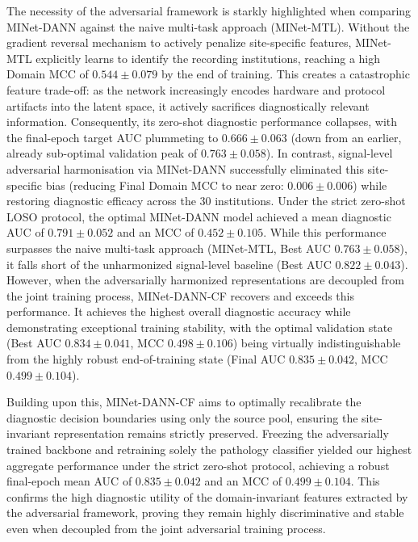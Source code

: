 \documentclass[preprint,12pt]{elsarticle}
\begin{document}
The necessity of the adversarial framework is starkly highlighted when comparing MINet-DANN against the naive multi-task approach (MINet-MTL). Without the gradient reversal mechanism to actively penalize site-specific features, MINet-MTL explicitly learns to identify the recording institutions, reaching a high Domain MCC of $0.544 \pm 0.079$ by the end of training. This creates a catastrophic feature trade-off: as the network increasingly encodes hardware and protocol artifacts into the latent space, it actively sacrifices diagnostically relevant information. Consequently, its zero-shot diagnostic performance collapses, with the final-epoch target AUC plummeting to $0.666 \pm 0.063$ (down from an earlier, already sub-optimal validation peak of $0.763 \pm 0.058$).
In contrast, signal-level adversarial harmonisation via MINet-DANN successfully eliminated this site-specific bias (reducing Final Domain MCC to near zero: $0.006 \pm 0.006$) while restoring diagnostic efficacy across the 30 institutions. Under the strict zero-shot LOSO protocol, the optimal MINet-DANN model achieved a mean diagnostic AUC of $0.791 \pm 0.052$ and an MCC of $0.452 \pm 0.105$. While this performance surpasses the naive multi-task approach (MINet-MTL, Best AUC $0.763 \pm 0.058$), it falls short of the unharmonized signal-level baseline (Best AUC $0.822 \pm 0.043$). However, when the adversarially harmonized representations are decoupled from the joint training process, MINet-DANN-CF recovers and exceeds this performance. It achieves the highest overall diagnostic accuracy while demonstrating exceptional training stability, with the optimal validation state (Best AUC $0.834 \pm 0.041$, MCC $0.498 \pm 0.106$) being virtually indistinguishable from the highly robust end-of-training state (Final AUC $0.835 \pm 0.042$, MCC $0.499 \pm 0.104$).

Building upon this, MINet-DANN-CF aims to optimally recalibrate the diagnostic decision boundaries using only the source pool, ensuring the site-invariant representation remains strictly preserved. Freezing the adversarially trained backbone and retraining solely the pathology classifier yielded our highest aggregate performance under the strict zero-shot protocol, achieving a robust final-epoch mean AUC of $0.835 \pm 0.042$ and an MCC of $0.499 \pm 0.104$. This confirms the high diagnostic utility of the domain-invariant features extracted by the adversarial framework, proving they remain highly discriminative and stable even when decoupled from the joint adversarial training process.
\end{document}
